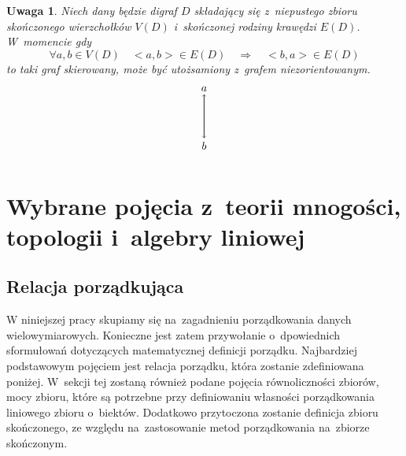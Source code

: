 \documentclass[12pt,a4paper]{report}
\newtheorem{definition}[theorem]{Definicja}
\newtheorem{uwaga}{Uwaga}
\begin{document}
\begin{uwaga}
Niech dany będzie digraf $D$ składający się z~niepustego zbioru skończonego wierzchołków $V(D)$ i~skończonej rodziny krawędzi $E(D)$. W~momencie gdy $$\forall{a,b} \in V(D) \quad  <a,b>  \in E(D) \quad \Rightarrow \quad <b,a>  \in E(D)$$ to taki graf skierowany, może być utożsamiony z~grafem niezorientowanym. 
$$
\begin{tikzpicture}[scale=.7]
\draw [->] (0,-2) --(0,0) ;
 \draw node(a) at (0,0.25) {$a$};
 \draw [->] (0,0) --(0,-2); 
 \draw node (b) at (0, -2.35) {$b$};
\end{tikzpicture}
$$

\end{uwaga}






\section{Wybrane pojęcia z~teorii mnogości, topologii i~algebry liniowej}\label{teoria mnogosci}
\subsection{Relacja porządkująca}


W niniejszej pracy skupiamy się na~zagadnieniu porządkowania danych wielowymiarowych. Konieczne jest zatem przywołanie o~dpowiednich sformułowań dotyczących matematycznej definicji porządku. Najbardziej podstawowym pojęciem jest relacja porządku, która zostanie zdefiniowana poniżej. W~sekcji tej zostaną również podane pojęcia równoliczności zbiorów, mocy zbioru, które są potrzebne przy definiowaniu własności porządkowania liniowego zbioru o~biektów. Dodatkowo przytoczona zostanie definicja zbioru skończonego, ze względu na~zastosowanie metod porządkowania na~zbiorze skończonym.

\end{document}
